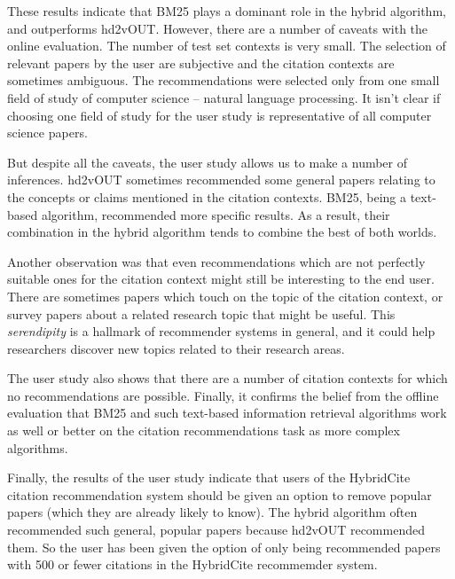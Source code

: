 These results indicate that BM25 plays a dominant role in the hybrid algorithm, and outperforms hd2vOUT. However, there are a number of caveats with the online evaluation. The number of test set contexts is very small. The selection of relevant papers by the user are subjective and the citation contexts are sometimes ambiguous. The recommendations were selected only from one small field of study of computer science -- natural language processing. It isn't clear if choosing one field of study for the user study is representative of all computer science papers. 

But despite all the caveats, the user study allows us to make a number of inferences. hd2vOUT sometimes recommended some general papers relating to the concepts or claims mentioned in the citation contexts. BM25, being a text-based algorithm, recommended more specific results. As a result, their combination in the hybrid algorithm tends to combine the best of both worlds. 

Another observation was that even recommendations which are not perfectly suitable ones for the citation context might still be interesting to the end user. There are sometimes papers which touch on the topic of the citation context, or survey papers about a related research topic that might be useful. This \textit{serendipity} is a hallmark of recommender systems in general, and it could help researchers discover new topics related to their research areas.

The user study also shows that there are a number of citation contexts for which no recommendations are possible. Finally, it confirms the belief from the offline evaluation that BM25 and such text-based information retrieval algorithms work as well or better on the citation recommendations task as more complex algorithms.

Finally, the results of the user study indicate that users of the HybridCite citation recommendation system should be given an option to remove popular papers (which they are already likely to know). The hybrid algorithm often recommended such general, popular papers because hd2vOUT recommended them. So the user has been given the option of only being recommended papers with 500 or fewer citations in the HybridCite recommemder system.